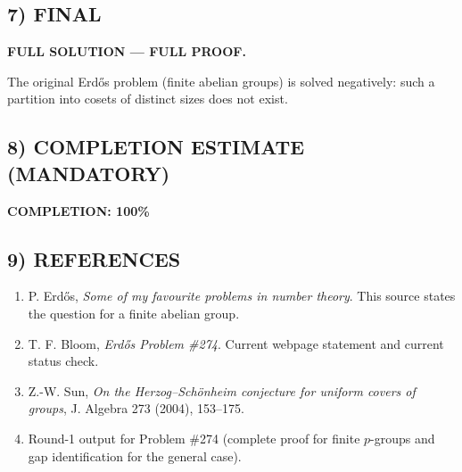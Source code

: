 \subsection*{7) FINAL}

\textbf{FULL SOLUTION --- FULL PROOF.}

The original Erd\H{o}s problem (finite abelian groups) is solved negatively: such a partition into cosets of distinct sizes does not exist.

\subsection*{8) COMPLETION ESTIMATE (MANDATORY)}

\textbf{COMPLETION: 100\%}

\subsection*{9) REFERENCES}

\begin{enumerate}
\item P. Erd\H{o}s, \emph{Some of my favourite problems in number theory}.  This source states the question for a finite abelian group.
\item T. F. Bloom, \emph{Erd\H{o}s Problem \#274}.  Current webpage statement and current status check.
\item Z.-W. Sun, \emph{On the Herzog--Sch\"onheim conjecture for uniform covers of groups}, J. Algebra 273 (2004), 153--175.
\item Round-1 output for Problem \#274 (complete proof for finite $p$-groups and gap identification for the general case).
\end{enumerate}



